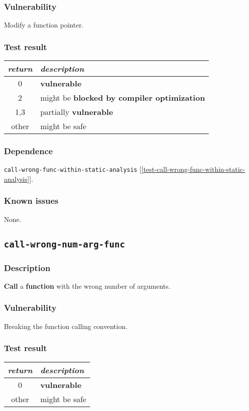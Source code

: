\documentclass[a4paper]{book}
\begin{document}
\subsubsection{Vulnerability}
Modify a function pointer.

\subsubsection{Test result}
\begin{tabular}{cl}
  \toprule
  \emph{return}  & \emph{description} \\
  \midrule
  0              & \textbf{vulnerable} \\
  2              & might be \textbf{blocked by compiler optimization} \\
  1,3            & partially \textbf{vulnerable} \\
  other          & might be safe \\
  \bottomrule
\end{tabular}
  
\subsubsection{Dependence}

\texttt{call-wrong-func-within-static-analysis} [\ref{test-call-wrong-func-within-static-analysis}].

\subsubsection{Known issues}

None.

\newpage
\subsection{\texttt{call-wrong-num-arg-func}}\label{test-call-wrong-num-arg-func}

\subsubsection{Description}
\textbf{Call} a \textbf{function} with the wrong number of arguments.

\subsubsection{Vulnerability}
Breaking the function calling convention.

\subsubsection{Test result}
\begin{tabular}{cl}
  \toprule
  \emph{return}  & \emph{description} \\
  \midrule
  0              & \textbf{vulnerable} \\
  other          & might be safe \\
  \bottomrule
\end{tabular}
\end{document}
